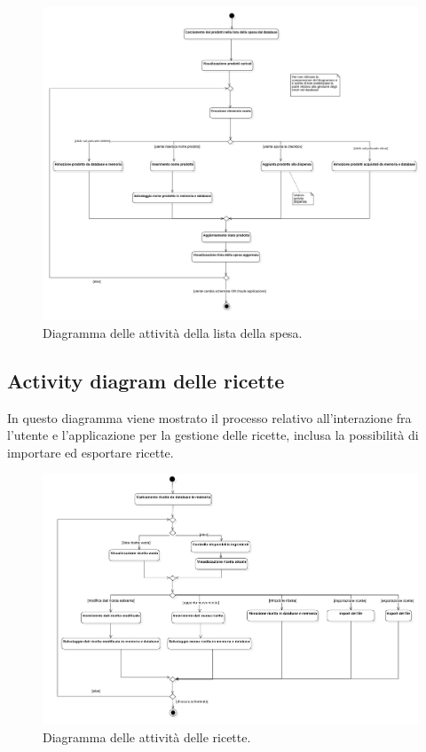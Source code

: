 \begin{figure}[H]
    \includegraphics[width=\linewidth]{images/activity-shopping-list.png}
    \caption{Diagramma delle attività della lista della spesa.}
    \label{fig:actshoplist}
\end{figure}

\newpage

\subsection{Activity diagram delle ricette}

In questo diagramma viene mostrato il processo relativo all'interazione fra l'utente e l'applicazione per la gestione delle ricette, inclusa la possibilità di importare ed esportare ricette.

\begin{figure}[H]
    \includegraphics[width=\linewidth]{images/activity-recipe.png}
    \caption{Diagramma delle attività delle ricette.}
    \label{fig:actrecipe}
\end{figure}

